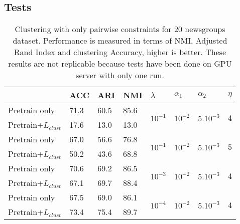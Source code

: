 \documentclass[a4paper]{article}
\begin{document}
\subsection{Tests}
\begin{table}[!h]
  \begin{tabular}{|l|l|l|l|l|l|l|l|}
    \hline
    &ACC  & ARI  & NMI & $\lambda$ & $\alpha_1$ & $\alpha_2$ & $\eta$   \\ \hline
    
    Pretrain only       &71.3 & 60.5 & 85.6 &\multirow{2}{*}{$10^{-1}$}&\multirow{2}{*}{$10^{-2}$}&\multirow{2}{*}{$5.10^{-3}$}&\multirow{2}{*}{4}\\
    Pretrain+$L_{clust}$&17.6 & 13.0 & 13.0 &&&&\\\hline  
  
    Pretrain only       &67.0 & 56.6 & 76.8 &\multirow{2}{*}{$10^{-1}$}&\multirow{2}{*}{$10^{-2}$}&\multirow{2}{*}{$5.10^{-3}$}&\multirow{2}{*}{5}\\
    Pretrain+$L_{clust}$&50.2 & 43.6 & 68.8 &&&&\\\hline

    Pretrain only       &70.6 & 69.2 & 86.5 &\multirow{2}{*}{$10^{-3}$}&\multirow{2}{*}{$10^{-2}$}&\multirow{2}{*}{$5.10^{-3}$}&\multirow{2}{*}{4}\\
    Pretrain+$L_{clust}$&67.1 & 69.7 & 88.4 &&&&\\\hline

    Pretrain only       &67.5 & 69.0 & 86.1 &\multirow{2}{*}{$10^{-4}$}&\multirow{2}{*}{$10^{-2}$}&\multirow{2}{*}{$5.10^{-3}$}&\multirow{2}{*}{4}\\
    Pretrain+$L_{clust}$&73.4 & 75.4 & 89.7 &&&&\\\hline
\end{tabular}
\caption{\label{tab:res2}Clustering with only pairwise constraints for 
20 newsgroups dataset. Performance is measured in terms of NMI, 
Adjusted Rand 
Index and clustering Accuracy, higher is better. These results are not
replicable because tests have been done on GPU server with only one run. 
}
\end{table}
\end{document}
